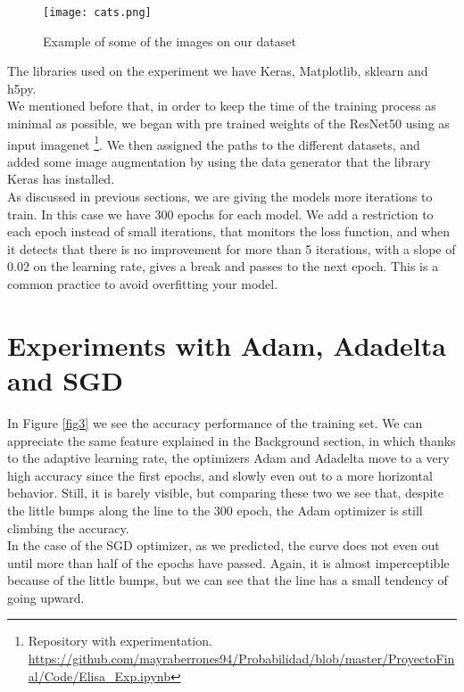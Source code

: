 \documentclass[review]{elsarticle}
\begin{document}
\begin{figure}[]
  \centering
  \texttt{[image: cats.png]}  
	\caption{Example of some of the images on our dataset}
\label{fig2}
\end{figure}

The libraries used on the experiment we have Keras, Matplotlib, sklearn and h5py.\\

We mentioned before that, in order to keep the time of the training process as minimal as possible, we began with pre trained weights of the ResNet50 using as input imagenet \footnote{Repository with experimentation. \url{https://github.com/mayraberrones94/Probabilidad/blob/master/ProyectoFinal/Code/Elisa_Exp.ipynb}}. We then assigned the paths to the different datasets, and added some image augmentation by using the data generator that the library Keras has installed.\\

As discussed in previous sections, we are giving the models more iterations to train. In this case we have 300 epochs for each model. We add a restriction to each epoch instead of small iterations, that monitors the loss function, and when it detects that there is no improvement for more than 5 iterations, with a slope of 0.02 on the learning rate, gives a break and passes to the next epoch. This is a common practice to avoid overfitting your model.\\

\section{Experiments with Adam, Adadelta and SGD}
 
 In Figure \ref{fig3} we see the accuracy performance of the training set. We can appreciate the same feature explained in the Background section, in which thanks to the adaptive learning rate, the optimizers Adam and Adadelta move to a very high accuracy since the first epochs, and slowly even out to a more horizontal behavior. Still, it is barely visible, but comparing these two we see that, despite the little bumps along the line to the 300 epoch, the Adam optimizer is still climbing the accuracy. \\
 
 In the case of the SGD optimizer, as we predicted, the curve does not even out until more than half of the epochs have passed. Again, it is almost imperceptible because of the little bumps, but we can see that the line has a small tendency of going upward.\\
 
\end{document}
